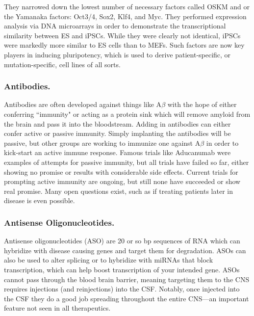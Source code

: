 They narrowed down the lowest number of necessary factors called OSKM and or the Yamanaka factors: Oct3/4, Sox2, Klf4, and Myc. They performed expression analysis via DNA microarrays in order to demonstrate the transcriptional similarity between ES and iPSCs. While they were clearly not identical, iPSCs were markedly more similar to ES cells than to MEFs. Such factors are now key players in inducing pluripotency, which is used to derive patient-specific, or mutation-specific, cell lines of all sorts. 

\subsubsection*{Antibodies.}

Antibodies are often developed against things like A$\beta$ with the hope of either conferring ``immunity" or acting as a protein sink which will remove amyloid from the brain and pass it into the bloodstream. Adding in antibodies can either confer active or passive immunity. Simply implanting the antibodies will be passive, but other groups are working to immunize one against A$\beta$ in order to kick-start an active immune response. Famous trials like Aducanumab were examples of attempts for passive immunity, but all trials have failed so far, either showing no promise or results with considerable side effects. Current trials for prompting active immunity are ongoing, but still none have succeeded or show real promise. Many open questions exist, such as if treating patients later in disease is even possible.


\subsubsection*{Antisense Oligonucleotides.}

Antisense oligonucleotides (ASO) are 20 or so bp sequences of RNA which can hybridize with disease causing genes and target them for degradation. ASOs can also be used to alter splicing or to hybridize with miRNAs that block transcription, which can help boost transcription of your intended gene. ASOs cannot pass through the blood brain barrier, meaning targeting them to the CNS requires injections (and reinjections) into the CSF. Notably, once injected into the CSF they do a good job spreading throughout the entire CNS---an important feature not seen in all therapeutics. \newline

